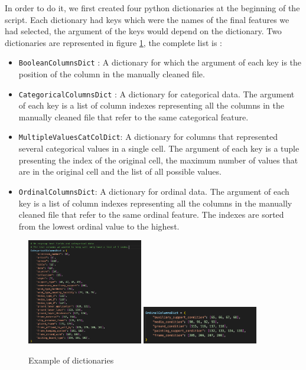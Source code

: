 \documentclass[11pt, oneside]{article}
\begin{document}
\medbreak
\noindent In order to do it, we first created four python dictionaries at the beginning of the script. Each dictionary had keys which were the names of the final features we had selected, the argument of the keys would depend on the dictionary.
Two dictionaries are represented in figure \ref{dictionaries}, the complete list is :
\begin{itemize}
    \item \texttt{BooleanColumnsDict} : A dictionary for which the argument of each key is the position of the column in the manually cleaned file.
    \item \texttt{CategoricalColumnsDict} : A dictionary for categorical data. The argument of each key is a list of column indexes representing all the columns in the manually cleaned file that refer to the same categorical feature.
    \item \texttt{MultipleValuesCatColDict}:
    A dictionary for columns that represented several categorical values in a single cell. The argument of each key is a tuple presenting the index of the original cell, the maximum number of values that are in the original cell and the list of all possible values.
    \item \texttt{OrdinalColumnsDict}: A dictionary for ordinal data. The argument of each key is a list of column indexes representing all the columns in the manually cleaned file that refer to the same ordinal feature. The indexes are sorted from the lowest ordinal value to the highest.
\end{itemize}

\begin{figure}[H]
    \includegraphics[width=0.45\textwidth]{images/catDic.png} \hfill
    \includegraphics[width=0.45\textwidth]{images/ordDic.png} \hfill
    \caption{Example of dictionaries}
    \label{dictionaries}
\end{figure}
\end{document}

